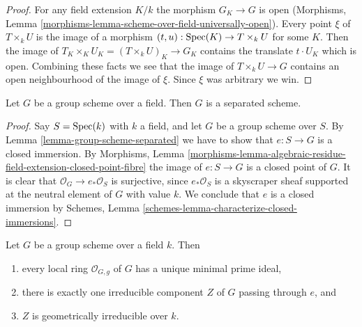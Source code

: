 \begin{proof}
For any field extension $K/k$ the morphism $G_K \to G$ is open
(Morphisms, Lemma \ref{morphisms-lemma-scheme-over-field-universally-open}).
Every point $\xi$ of $T \times_k U$ is the image of a morphism
$(t, u) : \mathop{\mathrm{Spec}}(K) \to T \times_k U$ for some $K$. Then the image of
$T_K \times_K U_K = (T \times_k U)_K \to G_K$ contains the translate
$t \cdot U_K$ which is open. Combining these facts we see that the
image of $T \times_k U \to G$ contains an open neighbourhood of
the image of $\xi$. Since $\xi$ was arbitrary we win.
\end{proof}

\begin{lemma}
\label{lemma-group-scheme-over-field-separated}
Let $G$ be a group scheme over a field.
Then $G$ is a separated scheme.
\end{lemma}

\begin{proof}
Say $S = \mathop{\mathrm{Spec}}(k)$ with $k$ a field, and let $G$ be a group scheme
over $S$. By
Lemma \ref{lemma-group-scheme-separated}
we have to show that $e : S \to G$ is a closed immersion. By
Morphisms, Lemma
\ref{morphisms-lemma-algebraic-residue-field-extension-closed-point-fibre}
the image of $e : S \to G$ is a closed point of $G$.
It is clear that $\mathcal{O}_G \to e_*\mathcal{O}_S$ is surjective,
since $e_*\mathcal{O}_S$ is a skyscraper sheaf supported at the neutral
element of $G$ with value $k$. We conclude that $e$ is a closed immersion by
Schemes, Lemma \ref{schemes-lemma-characterize-closed-immersions}.
\end{proof}

\begin{lemma}
\label{lemma-group-scheme-field-geometrically-irreducible}
Let $G$ be a group scheme over a field $k$.
Then
\begin{enumerate}
\item every local ring $\mathcal{O}_{G, g}$ of $G$ has a unique
minimal prime ideal,
\item there is exactly one irreducible component $Z$ of $G$
passing through $e$, and
\item $Z$ is geometrically irreducible over $k$.
\end{enumerate}
\end{lemma}

